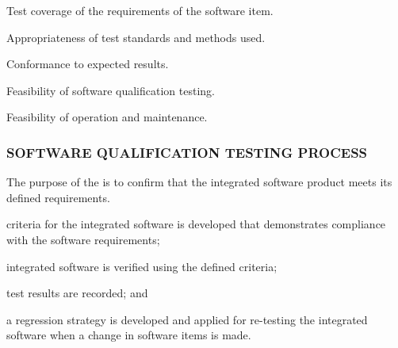 \begin{adjustwidth}{2em}{0pt}
\begin{compactenum}
\begin{compactenum}
\begin{compactenum}
							\item Test coverage of the requirements of the software item.

							\item Appropriateness of test standards and methods used.

							\item Conformance to expected results.

							\item Feasibility of software qualification testing.

							\item Feasibility of operation and maintenance.

						\end{compactenum}

					\end{compactenum}

				\end{compactenum}

			\end{adjustwidth}

		\newpage
		\subsubsection{SOFTWARE QUALIFICATION TESTING PROCESS\label{proc:software_qualification_testing_process}}

			\begin{adjustwidth}{2em}{0pt} 

				The purpose of the  is to confirm that the integrated software product meets its defined requirements.

			\end{adjustwidth}

			\begin{adjustwidth}{2em}{0pt} 

				\begin{compactitem}

					\item criteria for the integrated software is developed that demonstrates compliance with the software requirements;

					\item integrated software is verified using the defined criteria;

					\item test results are recorded; and

					\item a regression strategy is developed and applied for re-testing the integrated software when a change in software items is made.

				\end{compactitem}

			\end{adjustwidth}

